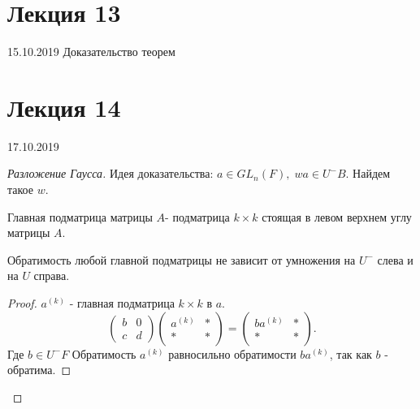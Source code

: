 \documentclass[12pt]{report}
\begin{document}
\section{Лекция 13}
15.10.2019
Доказательство теорем

\section{Лекция 14}
17.10.2019
\begin{proof}[Разложение Гаусса]
    Идея доказательства: $a \in  GL_n(F), \; wa \in  U^- B$. Найдем такое $w$.\\
    \begin{defn}
        Главная подматрица матрицы $A$- подматрица $k \times k$ стоящая в левом верхнем углу матрицы $A$.
    \end{defn}

    \begin{lm}
        Обратимость любой главной подматрицы не зависит от умножения на  $U^-$ слева и на  $U$ справа.
    \end{lm}
    \begin{proof}
	$a^{(k)}$ - главная подматрица $k \times k$ в $a$.
	 \[
	\left ( 
	\begin{array}{cc}
	    b&0\\
	    c&d
	\end{array}
	\right )
	\left ( 
	\begin{array}{cc}
	    a^{(k)}&* \\
	    *& *
	\end{array}
	\right )=
	\left ( 
	\begin{array}{cc}
	    ba^{(k)}&*\\
	    *&*
	\end{array}
	\right )
	.\] 
	$\mbox{Где } b \in  U^- F$ 
	Обратимость $a^{(k)} $ равносильно обратимости $ba^{(k)}$, так как $b$ - обратима.
    \end{proof}


\end{proof}
\end{document}
